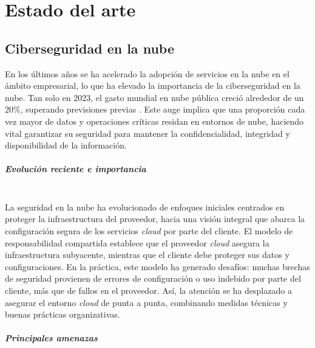 \documentclass[12pt,twoside,titlepage]{report}
\newcommand\blankpage{%
    \newpage
    \null
    \thispagestyle{empty}%
    \newpage}
\begin{document}
\newpage







\chapter{Estado del arte}\label{chap:estadoarte}


\section{Ciberseguridad en la nube}

En los últimos años se ha acelerado la adopción de servicios en la nube en el ámbito empresarial, lo que ha elevado la importancia de la ciberseguridad en la nube. Tan solo en 2023, el gasto mundial en nube pública creció alrededor de un 20\%, superando previsiones previas \cite{csa2023top}. Este auge implica que una proporción cada vez mayor de datos y operaciones críticas residan en entornos de nube, haciendo vital garantizar su seguridad para mantener la confidencialidad, integridad y disponibilidad de la información. 

\paragraph{Evolución reciente e importancia \\ \\}

La seguridad en la nube ha evolucionado de enfoques iniciales centrados en proteger la infraestructura del proveedor, hacia una visión integral que abarca la configuración segura de los servicios \textit{cloud} por parte del cliente. El modelo de responsabilidad compartida establece que el proveedor \textit{cloud} asegura la infraestructura subyacente, mientras que el cliente debe proteger sus datos y configuraciones. En la práctica, este modelo ha generado desafíos: muchas brechas de seguridad provienen de errores de configuración o uso indebido por parte del cliente, más que de fallos en el proveedor. Así, la atención se ha desplazado a asegurar el entorno \textit{cloud} de punta a punta, combinando medidas técnicas y buenas prácticas organizativas.

\paragraph{Principales amenazas \\ \\}
\end{document}
